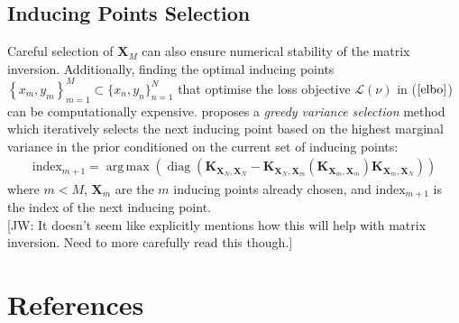 \documentclass[twoside,11pt]{article}
\newcommand{\jw}[1]{{\color{gray} [JW: #1]}}
\newcommand{\diag}{\operatorname{diag}}
\DeclareMathOperator*{\argmax}{arg\,max}
\begin{document}
\subsection{Inducing Points Selection}
Careful selection of $\mathbf{X}_M$ can also ensure numerical stability of the matrix inversion. Additionally, finding the optimal inducing points $\left\{x_m, y_m\right\}_{m=1}^{M} \subset \{x_n, y_n\}_{n=1}^{N}$ that optimise the loss objective $\mathcal{L}(\nu)$ in ($\ref{elbo}$) can be computationally expensive. \cite{burt2020convergence} proposes a \textit{greedy variance selection} method which iteratively selects the next inducing point based on the highest marginal variance in the prior conditioned on the current set of inducing points:
\begin{align}
    \label{greedy-varaince-selection}
    \text{index}_{m+1} = \argmax \left(\diag \left(\mathbf{K}_{\mathbf{X}_N, \mathbf{X}_N} - \mathbf{K}_{\mathbf{X}_N, \mathbf{X}_{m}} \left(\mathbf{K}_{\mathbf{X}_{m}, \mathbf{X}_{m}} \right) \mathbf{K}_{\mathbf{X}_{m}, \mathbf{X}_N}\right)\right)
\end{align}
where $m < M$, $\mathbf{X}_{m}$ are the $m$ inducing points already chosen, and $\text{index}_{m+1}$ is the index of the next inducing point.
\\\jw{It doesn't seem like \cite{burt2020convergence} explicitly mentions how this will help with matrix inversion. Need to more carefully read this though.}
\begingroup
\let\clearpage\relax
\AtNextBibliography{\small}
\section*{References}
\printbibliography[heading=talikarng, title = {References}]
\endgroup
\end{document}
